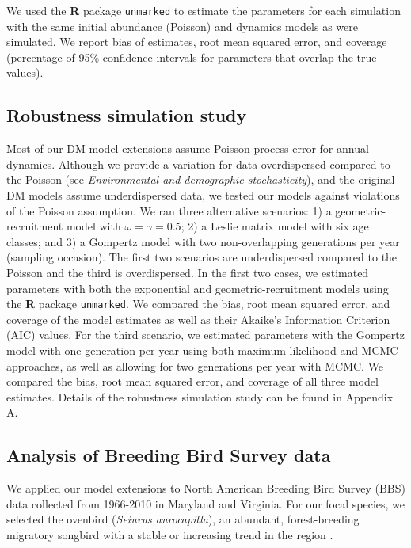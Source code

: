 \documentclass[12pt,english]{article}
\begin{document}
\begin{spacing}{1.9}
\begin{flushleft}
We used the \textbf{R} package \texttt{unmarked} to estimate the parameters 
for each simulation with the same
initial abundance (Poisson) and dynamics models as were simulated.
We report bias of estimates, root
mean squared error, and coverage (percentage of 95\% confidence
intervals for parameters that overlap the true values).

\subsection*{Robustness simulation study}

Most of our DM model extensions assume Poisson process error for annual dynamics.
Although we provide a variation for data overdispersed compared to the Poisson (see \textit{Environmental and demographic stochasticity}), 
and the original DM models assume underdispersed data,  
we tested our models against violations of the Poisson assumption.  
We ran three alternative scenarios: 1) a geometric-recruitment model with
$\omega = \gamma = 0.5$; 2) a Leslie matrix model with six age classes; and 3) 
a Gompertz model with two non-overlapping generations per year (sampling occasion).   
The first two scenarios are underdispersed compared to the Poisson and the third is overdispersed.
In the first two cases, we estimated parameters with both the exponential and geometric-recruitment
models using the \textbf{R} package \texttt{unmarked}.  We compared the bias,
root mean squared error, and coverage of the model estimates as well as their Akaike's Information
Criterion (AIC) values.
For the third scenario, we estimated parameters with the Gompertz model with 
one generation per year using both maximum likelihood and MCMC approaches, as well
as allowing for two generations per year with MCMC.  We compared the bias, root mean
squared error, and coverage of all three model estimates.  Details of the robustness simulation
study can be found in Appendix A.

\subsection*{Analysis of Breeding Bird Survey data}

We applied our model extensions to North American Breeding Bird Survey
(BBS) data collected from 1966-2010 in 
Maryland and Virginia. For our focal species, we selected the
ovenbird (\textit{Seiurus aurocapilla}), an abundant, 
forest-breeding migratory songbird with a stable or increasing trend
in the region \citep{porneluzi_etal:2011}. 


\end{flushleft}
\end{spacing}
\end{document}
